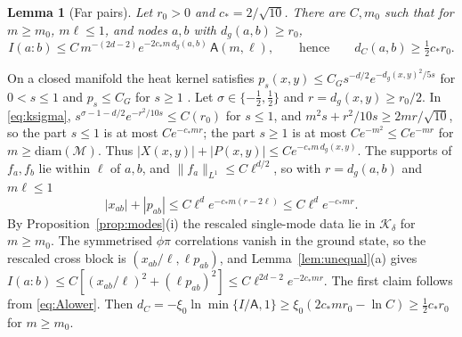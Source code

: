 \documentclass[11pt,a4paper]{article}
\makeatletter
\theoremstyle{stmt}
\newtheorem{lemma}[theorem]{Lemma}
\theoremstyle{defn}
\theoremstyle{rmk}
\renewenvironment{proof}[1][\proofname]{\par\pushQED{\qed}\normalfont\topsep6\p@\@plus6\p@\relax
  \trivlist\item[\hskip\labelsep{\sffamily\itshape\small #1.}]\ignorespaces}{\popQED\endtrivlist\@endpefalse}
\numberwithin{equation}{section}
\newcommand{\M}{\mathcal{M}}
\makeatother
\begin{document}
\begin{lemma}[Far pairs]\label{lem:far}
Let $r_0>0$ and $c_*=2/\sqrt{10}$. There are $C,m_0$ such that for $m\ge m_0$, $m\ell\le1$, and nodes $a,b$ with $d_g(a,b)\ge r_0$,
\[
I(a:b)\le C\,m^{-(2d-2)}e^{-2c_*m\,d_g(a,b)}\,\mathsf A(m,\ell),\qquad\text{hence}\qquad d_C(a,b)\ge\tfrac12c_*r_0 .
\]
\end{lemma}

\begin{proof}
On a closed manifold the heat kernel satisfies $p_s(x,y)\le C_Gs^{-d/2}e^{-d_g(x,y)^2/5s}$ for $0<s\le1$ and $p_s\le C_G$ for $s\ge1$ \cite{LY}. Let $\sigma\in\{-\tfrac12,\tfrac12\}$ and $r=d_g(x,y)\ge r_0/2$. In \eqref{eq:ksigma}, $s^{\sigma-1-d/2}e^{-r^2/10s}\le C(r_0)$ for $s\le1$, and $m^2s+r^2/10s\ge2mr/\sqrt{10}$, so the part $s\le1$ is at most $Ce^{-c_*mr}$; the part $s\ge1$ is at most $Ce^{-m^2}\le Ce^{-mr}$ for $m\ge\mathrm{diam}(\M)$. Thus $|X(x,y)|+|P(x,y)|\le Ce^{-c_*m\,d_g(x,y)}$. The supports of $f_a,f_b$ lie within $\ell$ of $a,b$, and $\|f_a\|_{L^1}\le C\ell^{d/2}$, so with $r=d_g(a,b)$ and $m\ell\le1$
\[
|x_{ab}|+|p_{ab}|\le C\ell^de^{-c_*m(r-2\ell)}\le C\ell^de^{-c_*mr}.
\]
By Proposition~\ref{prop:modes}(i) the rescaled single-mode data lie in $\mathcal K_\delta$ for $m\ge m_0$. The symmetrised $\phi\pi$ correlations vanish in the ground state, so the rescaled cross block is $(x_{ab}/\ell,\ell p_{ab})$, and Lemma~\ref{lem:unequal}(a) gives $I(a:b)\le C[(x_{ab}/\ell)^2+(\ell p_{ab})^2]\le C\ell^{2d-2}e^{-2c_*mr}$. The first claim follows from \eqref{eq:Alower}. Then $d_C=-\xi_0\ln\min\{I/\mathsf A,1\}\ge\xi_0(2c_*mr_0-\ln C)\ge\tfrac12c_*r_0$ for $m\ge m_0$.
\end{proof}
\end{document}
